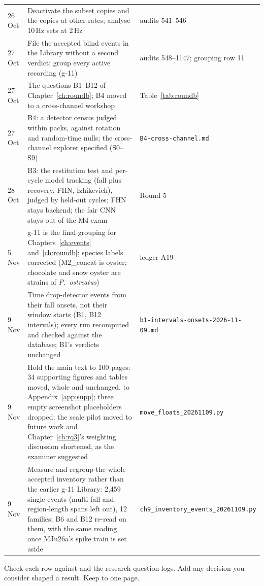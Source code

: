 \begin{table}[htbp]
\begin{tabularx}{\textwidth}{p{1.7cm} X p{2.6cm}}
26 Oct & Deactivate the subset copies and the copies at other rates; analyse 10\,Hz sets at 2\,Hz & audits 541--546\\
27 Oct & File the accepted blind events in the Library without a second verdict; group every active recording (g-11) & audits 548--1147; grouping row 11\\
27 Oct & The questions B1--B12 of Chapter~\ref{ch:roundb}; B4 moved to a cross-channel workshop & Table~\ref{tab:roundb}\\
27 Oct & B4: a detector census judged within packs, against rotation and random-time nulls; the cross-channel explorer specified (S0--S9) & \texttt{B4-cross-\allowbreak channel.md}\\
28 Oct & B3: the restitution test and per-cycle model tracking (fall plus recovery, FHN, Izhikevich), judged by held-out cycles; FHN stays backend; the fair CNN stays out of the M4 exam & Round 5\\
5 Nov & g-11 is the final grouping for Chapters~\ref{ch:events} and~\ref{ch:roundb}; species labels corrected (M2\_concat is oyster; chocolate and snow oyster are strains of \emph{P.\ ostreatus}) & ledger A19\\
9 Nov & Time drop-detector events from their fall onsets, not their window starts (B1, B12 intervals); every run recomputed and checked against the database; B1's verdicts unchanged & \texttt{b1-intervals-\allowbreak onsets-2026-11-09.md}\\
9 Nov & Hold the main text to 100 pages: 34 supporting figures and tables moved, whole and unchanged, to Appendix~\ref{app:supp}; three empty screenshot placeholders dropped; the scale pilot moved to future work and Chapter~\ref{ch:rq3}'s weighting discussion shortened, as the examiner suggested & \texttt{move\_floats\_\allowbreak 20261109.py}\\
9 Nov & Measure and regroup the whole accepted inventory rather than the earlier g-11 Library: 2,459 single events (multi-fall and region-length spans left out), 12 families; B6 and B12 re-read on them, with the same reading once MJu26a's spike train is set aside & \texttt{ch9\_inventory\_\allowbreak events\_20261109.py}\\
\bottomrule
\end{tabularx}
\end{table}

\begin{instructions}
Check each row against  and the research-question logs. Add any decision you
consider shaped a result. Keep to one page.
\end{instructions}
